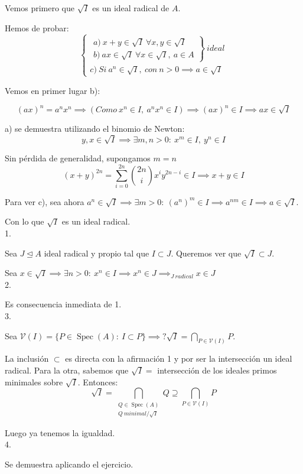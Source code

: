 \documentclass[openany]{book}
\begin{document}
\begin{demonstration}
    Vemos primero que $ \sqrt{I} $ es un ideal radical de $ A $.

    Hemos de probar:
    $$ \left\{
    \begin{array}{l}
        \left.
        \begin{array}{l}
            a)\ x+y \in \sqrt{I}\ \forall x,y \in \sqrt{I}\\
            b)\  ax \in \sqrt{ I}\ \forall x \in \sqrt{I},\ a \in A
        \end{array}
        \right\}\ ideal\\
        c)\ Si\ a^{n}\in \sqrt{I},\ con\ n>0 \implies a \in \sqrt{I}
    \end{array}
    \right. $$

    Vemos en primer lugar b):

    $$(ax)^{n} = a^{n}x^{n} \implies (Como\  x^{n} \in I,\ a^{n}x^{n}\in I) \implies (ax)^{n} \in I \implies ax \in \sqrt{I} $$

    a) se demuestra utilizando el binomio de Newton:
    $$ y,x \in \sqrt{I} \implies \exists m,n>0:\ x^{m} \in I,\ y^{n} \in I $$

    Sin pérdida de generalidad, supongamos $ m = n $
    $$ (x+y)^{2n} = \sum\limits_{i=0}^{2n} \binom{2n}{i} x^{i}y^{2n-i} \in I \implies x+y \in I $$

    Para ver c), sea ahora $ a^{n}\in \sqrt{I} \implies \exists m >0:\ (a^{n})^{m} \in I \implies a^{nm}\in I \implies a \in \sqrt{I} $.

    Con lo que $ \sqrt{I} $ es un ideal radical.\\
    1.

    Sea $ J \unlhd A$ ideal radical y propio tal que $ I \subset J $. Queremos ver que $ \sqrt{I}\subset J $.

    Sea $ x \in \sqrt{I} \implies \exists n> 0:\ x^{n}\in I\implies x^{n}\in J \implies_{J\ radical}x \in J $\\
    2.

    Es consecuencia inmediata de 1.\\
    3.

    Sea $ \mathcal{V}(I) = \{P \in \operatorname{Spec}(A):\ I \subset P\}\implies? \sqrt{I} = \bigcap_{P \in \mathcal{V}(I)}P $.

    La inclusión $ \subset  $ es directa con la afirmación 1 y por ser la intersección un ideal radical. Para la otra, sabemos que $ \sqrt{I} =  $ intersección de los ideales primos minimales sobre $ \sqrt{I} $. Entonces:
    $$ \sqrt{I} = \bigcap _{\substack{Q \in \operatorname{Spec}(A)\\ Q\ minimal / \sqrt{I}}} Q \supseteq \bigcap_{P \in \mathcal{V}(I)}P  $$

    Luego ya tenemos la igualdad.\\
    4.

    Se demuestra aplicando el ejercicio.

\end{demonstration}
\end{document}
